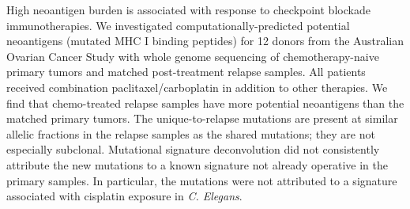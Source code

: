 High neoantigen burden is associated with response to checkpoint blockade immunotherapies. We investigated computationally-predicted potential neoantigens (mutated MHC I binding peptides) for 12 donors from the Australian Ovarian Cancer Study with whole genome sequencing of chemotherapy-naive primary tumors and matched post-treatment relapse samples. All patients received combination paclitaxel/carboplatin in addition to other therapies. We find that chemo-treated relapse samples have more potential neoantigens than the matched primary tumors. The unique-to-relapse mutations are present at similar allelic fractions in the relapse samples as the shared mutations; they are not especially subclonal. Mutational signature deconvolution did not consistently attribute the new mutations to a known signature not already operative in the primary samples. In particular, the mutations were not attributed to a signature associated with cisplatin exposure in \textit{C. Elegans}.

